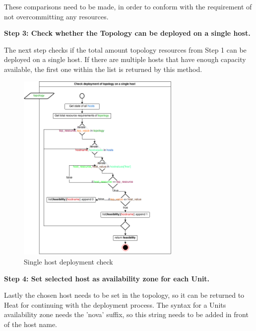 These comparisons need to be made, in order to conform with the requirement of not overcommitting any resources.


\textbf{Step 3: Check whether the Topology can be deployed on a single host.}

The next step checks if the total amount topology resources from Step 1 can be deployed on a single host. If there are multiple hosts that have enough capacity available, the first one within the list is returned by this method.

\begin{figure}[H]
\centering

\includegraphics[width=0.7\textwidth]{images/design/cm_single_host_check}

\caption{Single host deployment check}
\end{figure}


\textbf{Step 4: Set selected host as availability zone for each Unit.}

Lastly the chosen host needs to be set in the topology, so it can be returned to Heat for continuing with the deployment process. The syntax for a Units availability zone needs the 'nova' suffix, so this string needs to be added in front of the host name.

